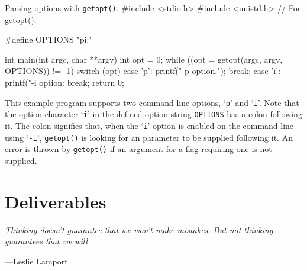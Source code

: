 \documentclass[11pt]{article}
\begin{document}
\begin{codelisting}{Parsing options with \texttt{getopt()}.}
#include <stdio.h>
#include <unistd.h> // For getopt().

#define OPTIONS "pi:"

int main(int argc, char **argv) {
    int opt = 0;
    while ((opt = getopt(argc, argv, OPTIONS)) != -1) {
        switch (opt) {
        case 'p':
            printf("-p option.\n");
            break;
        case 'i':
            printf("-i option: %
            break;
        }
    }
    return 0;
}
\end{codelisting}

This example program supports two command-line options, `\texttt{p}' and
`\texttt{i}'. Note that the option character `\texttt{i}' in the defined option
string \texttt{OPTIONS} has a colon following it. The colon signifies that, when
the `\texttt{i}' option is enabled on the command-line using `\texttt{-i}',
\texttt{getopt()} is looking for an parameter to be supplied following it. An
error is thrown by \texttt{getopt()} if an argument for a flag requiring one is
not supplied.


\section{Deliverables}

\textwidth
\epigraph{\emph{Thinking doesn't guarantee that we won't make mistakes. But
not thinking guarantees that we will.}}{---Leslie Lamport}
\end{document}
